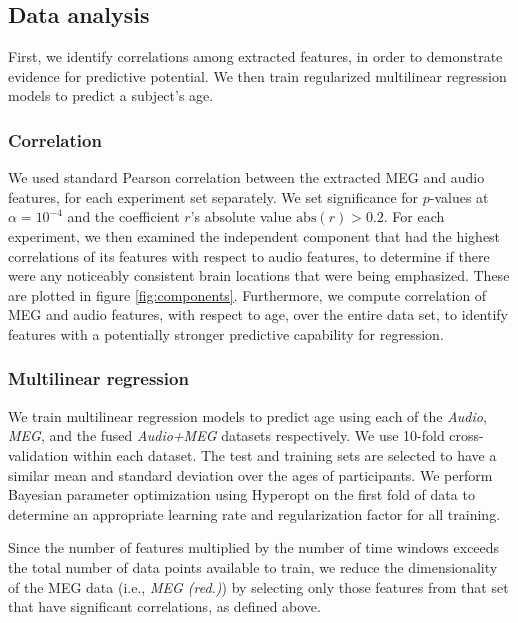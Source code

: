 \documentclass[utf8]{frontiersSCNS} %
\begin{document}
\subsection{Data analysis}

First, we identify correlations among extracted features, in order to demonstrate evidence for predictive potential. We then train regularized multilinear regression models to predict a subject's age.

\subsubsection{Correlation}

We used standard Pearson correlation between the extracted MEG and audio features, for each experiment set separately. We set significance for $p$-values at $\alpha = 10^{-4}$ and the coefficient $r$'s absolute value $\text{abs}(r) > 0.2$. For each experiment, we then examined the independent component that had the highest correlations of its features with respect to audio features, to determine if there were any noticeably consistent brain locations that were being emphasized. These are plotted in figure \ref{fig:components}. Furthermore, we compute correlation of MEG and audio features, with respect to age, over the entire data set, to identify features with a potentially stronger predictive capability for regression.

\subsubsection{Multilinear regression}

We train multilinear regression models to predict age using each of the \textit{Audio}, \textit{MEG}, and the fused \textit{Audio+MEG} datasets respectively. We use 10-fold cross-validation within each dataset. The test and training sets are selected to have a similar mean and standard deviation over the ages of participants. We perform Bayesian parameter optimization using Hyperopt \cite{Bergstra2013} on the first fold of data to determine an appropriate learning rate and regularization factor for all training.

Since the number of features multiplied by the number of time windows exceeds the total number of data points available to train, we reduce the dimensionality of the MEG data (i.e., {\em MEG (red.)}) by selecting only those features from that set that have significant correlations, as defined above.
\end{document}
